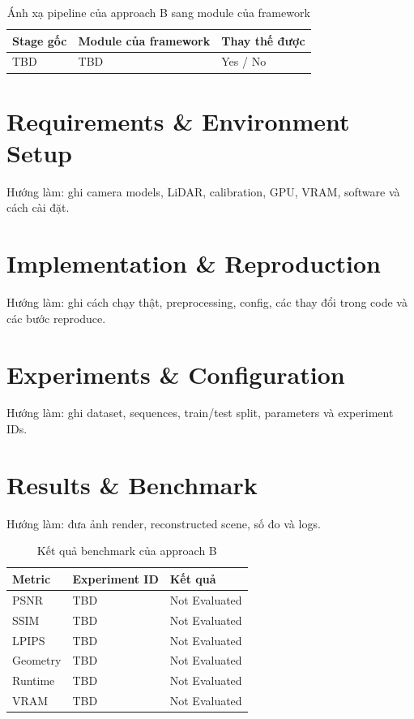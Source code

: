 \begin{table}[H]
  \centering
  \caption{Ánh xạ pipeline của approach B sang module của framework}
  \begin{tabularx}{\linewidth}{X X l}
    \toprule
    \textbf{Stage gốc} & \textbf{Module của framework} & \textbf{Thay thế được} \\
    \midrule
    TBD & TBD & Yes / No \\
    \bottomrule
  \end{tabularx}
\end{table}

\section{Requirements \& Environment Setup}

Hướng làm: ghi camera models, LiDAR, calibration, GPU, VRAM, software và cách cài đặt.

\section{Implementation \& Reproduction}

Hướng làm: ghi cách chạy thật, preprocessing, config, các thay đổi trong code và các bước reproduce.

\section{Experiments \& Configuration}

Hướng làm: ghi dataset, sequences, train/test split, parameters và experiment IDs.

\section{Results \& Benchmark}

Hướng làm: đưa ảnh render, reconstructed scene, số đo và logs.

\begin{table}[H]
  \centering
  \caption{Kết quả benchmark của approach B}
  \begin{tabularx}{\linewidth}{X l l}
    \toprule
    \textbf{Metric} & \textbf{Experiment ID} & \textbf{Kết quả} \\
    \midrule
    PSNR & TBD & Not Evaluated \\
    SSIM & TBD & Not Evaluated \\
    LPIPS & TBD & Not Evaluated \\
    Geometry & TBD & Not Evaluated \\
    Runtime & TBD & Not Evaluated \\
    VRAM & TBD & Not Evaluated \\
    \bottomrule
  \end{tabularx}
\end{table}

